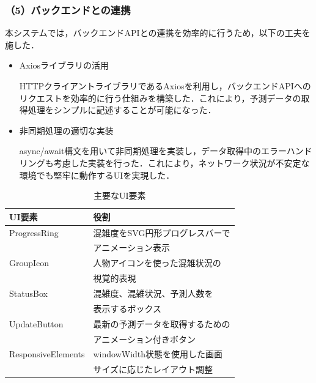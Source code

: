 \subsubsection*{（5）バックエンドとの連携}
本システムでは，バックエンドAPIとの連携を効率的に行うため，以下の工夫を施した．

\begin{itemize}
	\item Axiosライブラリの活用
	
	HTTPクライアントライブラリであるAxiosを利用し，バックエンドAPIへのリクエストを効率的に行う仕組みを構築した．これにより，予測データの取得処理をシンプルに記述することが可能になった．
	
	\item 非同期処理の適切な実装
	
	async/await構文を用いて非同期処理を実装し，データ取得中のエラーハンドリングも考慮した実装を行った．これにより，ネットワーク状況が不安定な環境でも堅牢に動作するUIを実現した．
\end{itemize}

\begin{table}[tb]
	\centering
	\caption{主要なUI要素}
	\label{tbl:UI_components}
	\small
	\setlength{\tabcolsep}{4pt}
	\doublerulesep=0.3pt
	\begin{tabular}{l|p{5cm}} \hline\hline\hline
		UI要素 & 役割 \\ \hline
		ProgressRing & 混雑度をSVG円形プログレスバーで\\
		&アニメーション表示 \\ \hline
		GroupIcon & 人物アイコンを使った混雑状況の\\
		&視覚的表現 \\ \hline
		StatusBox & 混雑度、混雑状況、予測人数を\\
		&表示するボックス \\ \hline
		UpdateButton & 最新の予測データを取得するための\\
		&アニメーション付きボタン \\ \hline
		ResponsiveElements & windowWidth状態を使用した画面\\
		&サイズに応じたレイアウト調整 \\ \hline\hline\hline
	\end{tabular}
\end{table}

